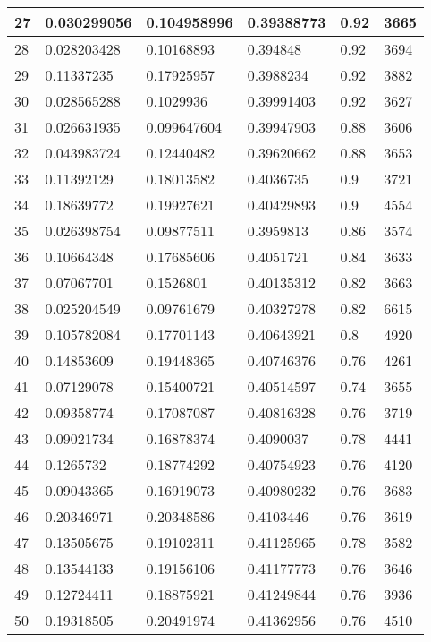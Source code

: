 \begin{longtable}{|l|l|l|l|l|l|}
27 & 0.030299056 & 0.104958996 & 0.39388773 & 0.92 & 3665 \\ \hline 
28 & 0.028203428 & 0.10168893 & 0.394848 & 0.92 & 3694 \\ \hline 
29 & 0.11337235 & 0.17925957 & 0.3988234 & 0.92 & 3882 \\ \hline 
30 & 0.028565288 & 0.1029936 & 0.39991403 & 0.92 & 3627 \\ \hline 
31 & 0.026631935 & 0.099647604 & 0.39947903 & 0.88 & 3606 \\ \hline 
32 & 0.043983724 & 0.12440482 & 0.39620662 & 0.88 & 3653 \\ \hline 
33 & 0.11392129 & 0.18013582 & 0.4036735 & 0.9 & 3721 \\ \hline 
34 & 0.18639772 & 0.19927621 & 0.40429893 & 0.9 & 4554 \\ \hline 
35 & 0.026398754 & 0.09877511 & 0.3959813 & 0.86 & 3574 \\ \hline 
36 & 0.10664348 & 0.17685606 & 0.4051721 & 0.84 & 3633 \\ \hline 
37 & 0.07067701 & 0.1526801 & 0.40135312 & 0.82 & 3663 \\ \hline 
38 & 0.025204549 & 0.09761679 & 0.40327278 & 0.82 & 6615 \\ \hline 
39 & 0.105782084 & 0.17701143 & 0.40643921 & 0.8 & 4920 \\ \hline 
40 & 0.14853609 & 0.19448365 & 0.40746376 & 0.76 & 4261 \\ \hline 
41 & 0.07129078 & 0.15400721 & 0.40514597 & 0.74 & 3655 \\ \hline 
42 & 0.09358774 & 0.17087087 & 0.40816328 & 0.76 & 3719 \\ \hline 
43 & 0.09021734 & 0.16878374 & 0.4090037 & 0.78 & 4441 \\ \hline 
44 & 0.1265732 & 0.18774292 & 0.40754923 & 0.76 & 4120 \\ \hline 
45 & 0.09043365 & 0.16919073 & 0.40980232 & 0.76 & 3683 \\ \hline 
46 & 0.20346971 & 0.20348586 & 0.4103446 & 0.76 & 3619 \\ \hline 
47 & 0.13505675 & 0.19102311 & 0.41125965 & 0.78 & 3582 \\ \hline 
48 & 0.13544133 & 0.19156106 & 0.41177773 & 0.76 & 3646 \\ \hline 
49 & 0.12724411 & 0.18875921 & 0.41249844 & 0.76 & 3936 \\ \hline 
50 & 0.19318505 & 0.20491974 & 0.41362956 & 0.76 & 4510 \\ \hline 
\end{longtable}